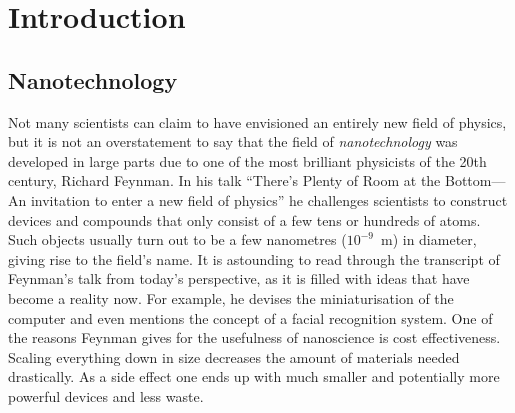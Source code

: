 
\chapter{Introduction}
\label{sec:introduction}

%
\section{Nanotechnology}
\label{sec:nanotechnology}

Not many scientists can claim to have envisioned an entirely new field of
physics, but it is not an overstatement to say that the field of
\emph{nanotechnology} was developed in large parts due to one of the most
brilliant physicists of the 20th century, Richard Feynman. In his talk ``There's
Plenty of Room at the Bottom---An invitation to enter a new field of
physics''\autocite{Feynman_TherePlentyRoom_1960} he challenges scientists to
construct devices and compounds that only consist of a few tens or hundreds of
atoms. Such objects usually turn out to be a few nanometres ($10^{-9}$~m) in
diameter, giving rise to the field's name. It is astounding to read through the
transcript of Feynman's talk from today's perspective, as it is filled with
ideas that have become a reality now. For example, he devises the
miniaturisation of the computer and even mentions the concept of a facial
recognition system. One of the reasons Feynman gives for the usefulness of nanoscience 
is cost effectiveness. Scaling everything down in size decreases the
amount of materials needed drastically. As a side effect one ends up with much
smaller and potentially more powerful devices and less waste.

